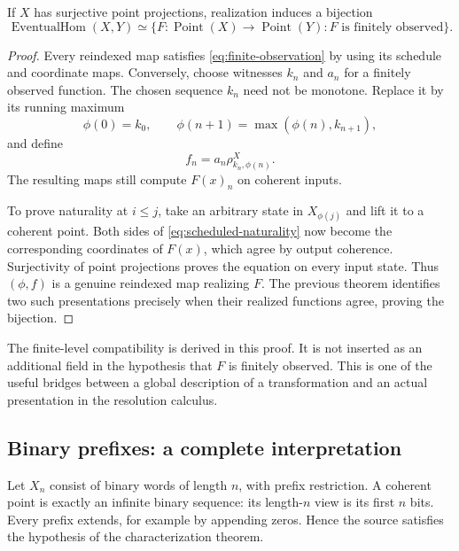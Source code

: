 \begin{theorem}\label{KS63}
If \(X\) has surjective point projections, realization induces a bijection
\[
 \operatorname{EventualHom}(X,Y)
 \simeq
 \{F:\operatorname{Point}(X)\to\operatorname{Point}(Y):F
 \text{ is finitely observed}\}.
\]
\end{theorem}
\begin{proof}
Every reindexed map satisfies \eqref{eq:finite-observation} by using its schedule and coordinate maps. Conversely, choose witnesses \(k_n\) and \(a_n\) for a finitely observed function. The chosen sequence \(k_n\) need not be monotone. Replace it by its running maximum
\[
 \phi(0)=k_0,\qquad \phi(n+1)=\max(\phi(n),k_{n+1}),
\]
and define
\[
 f_n=a_n\rho^X_{k_n,\phi(n)}.
\]
The resulting maps still compute \(F(x)_n\) on coherent inputs.

To prove naturality at \(i\le j\), take an arbitrary state in \(X_{\phi(j)}\) and lift it to a coherent point. Both sides of \eqref{eq:scheduled-naturality} now become the corresponding coordinates of \(F(x)\), which agree by output coherence. Surjectivity of point projections proves the equation on every input state. Thus \((\phi,f)\) is a genuine reindexed map realizing \(F\). The previous theorem identifies two such presentations precisely when their realized functions agree, proving the bijection.
\end{proof}
The finite-level compatibility is derived in this proof. It is not inserted as an additional field in the hypothesis that \(F\) is finitely observed. This is one of the useful bridges between a global description of a transformation and an actual presentation in the resolution calculus.


\subsection{Binary prefixes: a complete interpretation}
Let \(X_n\) consist of binary words of length \(n\), with prefix restriction. A coherent point is exactly an infinite binary sequence: its length-\(n\) view is its first \(n\) bits. Every prefix extends, for example by appending zeros. Hence the source satisfies the hypothesis of the characterization theorem.

